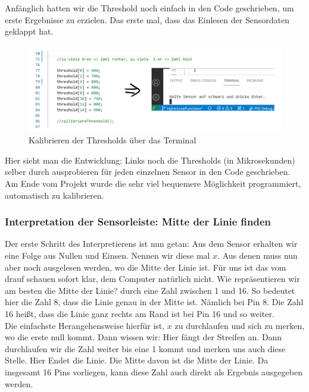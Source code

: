 	Anfänglich hatten wir die Threshold noch einfach in den Code geschrieben, um erste Ergebnisse zu erzielen. Das erste mal, dass das Einlesen der Sensordaten geklappt hat. 
	
	\begin{figure}[H]
		\centering
		\label{Code1}
		\includegraphics[scale=0.5]{img/Sensor/Code1.png}
		\caption{Kalibrieren der Thresholds über das Terminal}
	\end{figure}

	
	Hier sieht man die Entwicklung: Links noch die Thresholds (in Mikrosekunden) selber durch ausprobieren für jeden einzelnen Sensor in den Code geschrieben. Am Ende vom Projekt wurde die sehr viel bequemere Möglichkeit programmiert, automatisch zu kalibrieren.
	
	\subsubsection{Interpretation der Sensorleiste: Mitte der Linie finden}
	Der erste Schritt des Interpretierens ist nun getan: Aus dem Sensor erhalten wir eine Folge aus Nullen und Einsen. Nennen wir diese mal $x$. Aus denen muss nun aber noch ausgelesen werden, wo die Mitte der Linie ist. Für uns ist das vom drauf schauen sofort klar, dem Computer natürlich nicht. Wie repräsentieren wir am besten die Mitte der Linie? durch eine Zahl zwischen 1 und 16. So bedeutet hier die Zahl 8, dass die Linie genau in der Mitte ist. Nämlich bei Pin 8. Die Zahl 16 heißt, dass die Linie ganz rechts am Rand ist bei Pin 16 und so weiter.\\

	Die einfachste Herangehensweise hierfür ist, $x$ zu durchlaufen und sich zu merken, wo die erste null kommt. Dann wissen wir: Hier fängt der Streifen an. Dann durchlaufen wir die Zahl weiter bis eine 1 kommt und merken uns auch diese Stelle. Hier Endet die Linie. Die Mitte davon ist die Mitte der Linie. Da insgesamt 16 Pins vorliegen, kann diese Zahl auch direkt als Ergebnis ausgegeben werden.
	
